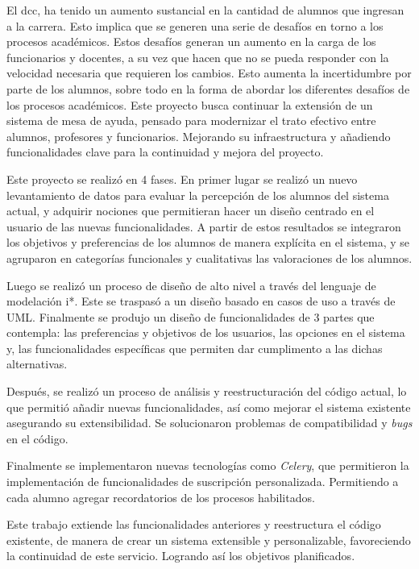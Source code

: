 \begin{resumen}
   \par El \acrfull{dcc}, ha tenido un aumento sustancial en la cantidad de alumnos que ingresan a la carrera. Esto implica que se generen una serie de desafíos en torno a los procesos académicos. Estos desafíos generan un aumento en la carga de los funcionarios y docentes, a su vez que hacen que no se pueda responder con la velocidad necesaria que requieren los cambios. Esto aumenta la incertidumbre por parte de los alumnos, sobre todo en la forma de abordar los diferentes desafíos de los procesos académicos. Este proyecto busca continuar la extensión de un sistema de mesa de ayuda, pensado para modernizar el trato efectivo entre alumnos, profesores y funcionarios. Mejorando su infraestructura y añadiendo funcionalidades clave para la continuidad y mejora del proyecto.

   \par Este proyecto se realizó en 4 fases. En primer lugar se realizó un nuevo levantamiento de datos para evaluar la percepción de los alumnos del sistema actual, y adquirir nociones que permitieran hacer un diseño centrado en el usuario de las nuevas funcionalidades. A partir de estos resultados se integraron los objetivos y preferencias de los alumnos de manera explícita en el sistema, y se agruparon en categorías funcionales y cualitativas las valoraciones de los alumnos.

   \par Luego se realizó un proceso de diseño de alto nivel a través del lenguaje de modelación \gls{i*}. Este se traspasó a un diseño basado en casos de uso a través de UML. Finalmente se produjo un diseño de funcionalidades de 3 partes que contempla: las preferencias y objetivos de los usuarios, las opciones en el sistema y, las funcionalidades específicas que permiten dar cumplimento a las dichas alternativas.

   \par Después, se realizó un proceso de análisis y reestructuración del código actual, lo que permitió añadir nuevas funcionalidades, así como mejorar el sistema existente asegurando su extensibilidad. Se solucionaron problemas de compatibilidad y \textit{bugs} en el código.

   \par Finalmente se implementaron nuevas tecnologías como \textit{Celery}, que permitieron la implementación de funcionalidades de suscripción personalizada. Permitiendo a cada alumno agregar recordatorios de los procesos habilitados.

   \par Este trabajo extiende las funcionalidades anteriores y reestructura el código existente, de manera de crear un sistema extensible y personalizable, favoreciendo la continuidad de este servicio. Logrando así los objetivos planificados.
   
\end{resumen}